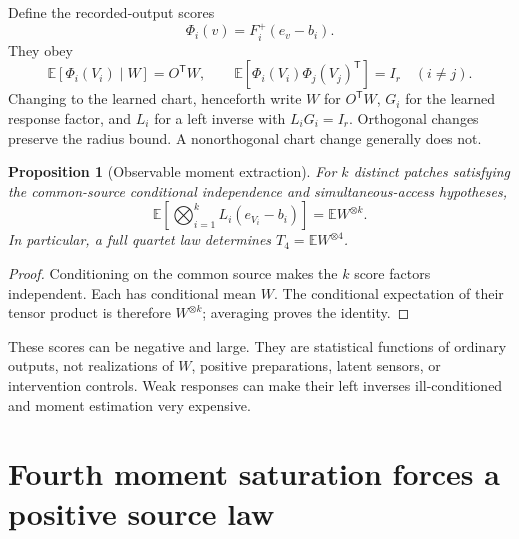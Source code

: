 \documentclass[11pt]{article}
\newtheorem{proposition}[theorem]{Proposition}
\theoremstyle{definition}
\theoremstyle{remark}
\newcommand{\E}{\mathbb E}
\newcommand{\trans}{\mathsf T}
\newcommand{\tensor}[2]{#1^{\otimes #2}}
\begin{document}
Define the recorded-output scores
\begin{equation}
\Phi_i(v)=F_i^+(e_v-b_i).
\label{eq:score}
\end{equation}
They obey
\begin{equation}
\E[\Phi_i(V_i)\mid W]=O^\trans W,
\qquad
\E[\Phi_i(V_i)\Phi_j(V_j)^\trans]=I_r\quad(i\ne j).
\label{eq:score-mean}
\end{equation}
Changing to the learned chart, henceforth write $W$ for $O^\trans W$,
$G_i$ for the learned response factor, and $L_i$ for a left inverse with
$L_iG_i=I_r$. Orthogonal changes preserve the radius bound. A nonorthogonal
chart change generally does not.

\begin{proposition}[Observable moment extraction]
\label{prop:extraction}
For $k$ distinct patches satisfying the common-source conditional
independence and simultaneous-access hypotheses,
\begin{equation}
\E\left[\bigotimes_{i=1}^k L_i(e_{V_i}-b_i)\right]
=\E\tensor{W}{k}.
\label{eq:tensor-extract}
\end{equation}
In particular, a full quartet law determines $T_4=\E\tensor{W}{4}$.
\end{proposition}
\begin{proof}
Conditioning on the common source makes the $k$ score factors independent.
Each has conditional mean $W$. The conditional expectation of their tensor
product is therefore $\tensor{W}{k}$; averaging proves the identity.
\end{proof}

These scores can be negative and large. They are statistical functions of
ordinary outputs, not realizations of $W$, positive preparations, latent
sensors, or intervention controls. Weak responses can make their left
inverses ill-conditioned and moment estimation very expensive.

\section{Fourth moment saturation forces a positive source law}
\label{sec:exact}
\end{document}
